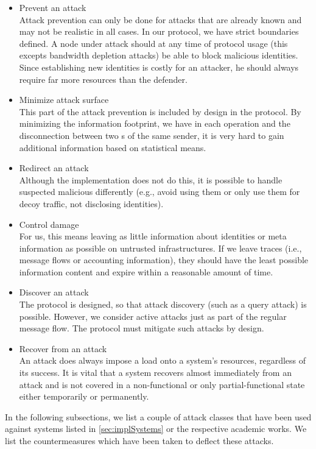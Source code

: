 \begin{itemize}
	\item Prevent an attack\\
	Attack prevention can only be done for attacks that are already known and may not be realistic in all cases. In our protocol, we have strict boundaries defined. A node under attack should at any time of protocol usage (this excepts bandwidth depletion attacks) be able to block malicious identities. Since establishing new identities is costly for an attacker, he should always require far more resources than the defender.
	\item Minimize attack surface\\
	This part of the attack prevention is included by design in the protocol. By minimizing the information footprint, we have in each operation and the disconnection between two s of the same sender, it is very hard to gain additional information based on statistical means.
	\item Redirect an attack\\
	Although the implementation does not do this, it is possible to handle suspected malicious \VortexNode{} differently (e.g., avoid using them or only use them for decoy traffic, not disclosing identities).
	\item Control damage\\
	For us, this means leaving as little information about identities or meta information as possible on untrusted infrastructures. If we leave traces (i.e., message flows or accounting information), they should have the least possible information content and expire within a reasonable amount of time.
	\item Discover an attack\\
	The protocol is designed, so that attack discovery (such as a query attack) is possible. However, we consider active attacks just as part of the regular message flow. The protocol must mitigate such attacks by design.
	\item Recover from an attack\\
	An attack does always impose a load onto a system's resources, regardless of its success. It is vital that a system recovers almost immediately from an attack and is not covered in a non-functional or only partial-functional state either temporarily or permanently.
\end{itemize}

In the following subsections, we list a couple of attack classes that have been used against systems listed in \cref{sec:implSystems} or the respective academic works. We list the countermeasures which have been taken to deflect these attacks.

